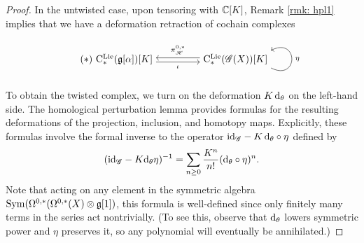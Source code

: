 \begin{proof}
In the untwisted case, upon tensoring with $\mathbb C[K]$, Remark \ref{rmk: hpl1} implies that we have a deformation retraction of cochain complexes
\begin{equation*}\tag{$\ast$}
  \begin{tikzpicture}[baseline=(L.base),anchor=base,->,auto,swap]
     \path node (L) {$\clieu_*(\fg[\alpha])[K]$} ++(4,0) node (M) {$\clieu_*(\sG (X))[K]$} 
     (M.mid) +(0,.075) coordinate (raise) +(0,-.075) coordinate (lower);
     \draw (L.east |- lower) to node {$\scriptstyle \iota$} (M.west |- lower);
     \draw (M.west |- raise) to node {$\scriptstyle \pi_{\sH}^{0,*} $} (L.east |- raise);
     \draw (M.south east) ..controls +(1,-.5) and +(1,.5) .. node {$\scriptstyle \eta$} (M.north east);
  \end{tikzpicture}\end{equation*}
To obtain the twisted complex, we turn on the deformation $K \, {\rm d}_\theta$ on the left-hand side. 
The homological perturbation lemma provides formulas for the resulting deformations of the projection, inclusion, and homotopy maps.
Explicitly, these formulas involve the formal inverse to the operator ${\rm id}_{\mathscr G} - K \,{\rm d}_\theta \circ \eta$ defined by
\[
({\rm id}_{\mathscr G} - K {\rm d}_\theta \eta)^{-1} = \sum_{n \geq 0} \frac{K^n}{n!} ({\rm d}_\theta \circ \eta)^n  .
\] 
Note that acting on any element in the symmetric algebra~${\rm Sym}(\Omega^{0,*}(\Omega^{0,*}(X) \otimes \mathfrak g[1])$, this formula is well-defined since only finitely many terms in the series act nontrivially.
(To see this, observe that ${\rm d}_\theta$ lowers symmetric power and $\eta$ preserves it, so any polynomial will eventually be annihilated.)


\end{proof}
